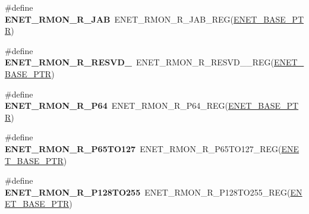 \begin{DoxyCompactItemize}
\item 
\hypertarget{group___e_n_e_t___register___accessor___macros_gac89cfeeea3d6804f8e5e5ec467472b7e}{}\#define {\bfseries E\+N\+E\+T\+\_\+\+R\+M\+O\+N\+\_\+\+R\+\_\+\+J\+A\+B}~E\+N\+E\+T\+\_\+\+R\+M\+O\+N\+\_\+\+R\+\_\+\+J\+A\+B\+\_\+\+R\+E\+G(\hyperlink{group___e_n_e_t___peripheral_gab64a2d991cc2bd76dd55ee25a52dcb5c}{E\+N\+E\+T\+\_\+\+B\+A\+S\+E\+\_\+\+P\+T\+R})\label{group___e_n_e_t___register___accessor___macros_gac89cfeeea3d6804f8e5e5ec467472b7e}

\item 
\hypertarget{group___e_n_e_t___register___accessor___macros_ga0b266930d57561032880164a69b9f7b1}{}\#define {\bfseries E\+N\+E\+T\+\_\+\+R\+M\+O\+N\+\_\+\+R\+\_\+\+R\+E\+S\+V\+D\+\_}~E\+N\+E\+T\+\_\+\+R\+M\+O\+N\+\_\+\+R\+\_\+\+R\+E\+S\+V\+D\+\_\+\_\+\+R\+E\+G(\hyperlink{group___e_n_e_t___peripheral_gab64a2d991cc2bd76dd55ee25a52dcb5c}{E\+N\+E\+T\+\_\+\+B\+A\+S\+E\+\_\+\+P\+T\+R})\label{group___e_n_e_t___register___accessor___macros_ga0b266930d57561032880164a69b9f7b1}

\item 
\hypertarget{group___e_n_e_t___register___accessor___macros_ga358714bb5af0b88fa0754074684960f1}{}\#define {\bfseries E\+N\+E\+T\+\_\+\+R\+M\+O\+N\+\_\+\+R\+\_\+\+P64}~E\+N\+E\+T\+\_\+\+R\+M\+O\+N\+\_\+\+R\+\_\+\+P64\+\_\+\+R\+E\+G(\hyperlink{group___e_n_e_t___peripheral_gab64a2d991cc2bd76dd55ee25a52dcb5c}{E\+N\+E\+T\+\_\+\+B\+A\+S\+E\+\_\+\+P\+T\+R})\label{group___e_n_e_t___register___accessor___macros_ga358714bb5af0b88fa0754074684960f1}

\item 
\hypertarget{group___e_n_e_t___register___accessor___macros_ga3a41b9ac512a20e1a99638ef76b9f2fa}{}\#define {\bfseries E\+N\+E\+T\+\_\+\+R\+M\+O\+N\+\_\+\+R\+\_\+\+P65\+T\+O127}~E\+N\+E\+T\+\_\+\+R\+M\+O\+N\+\_\+\+R\+\_\+\+P65\+T\+O127\+\_\+\+R\+E\+G(\hyperlink{group___e_n_e_t___peripheral_gab64a2d991cc2bd76dd55ee25a52dcb5c}{E\+N\+E\+T\+\_\+\+B\+A\+S\+E\+\_\+\+P\+T\+R})\label{group___e_n_e_t___register___accessor___macros_ga3a41b9ac512a20e1a99638ef76b9f2fa}

\item 
\hypertarget{group___e_n_e_t___register___accessor___macros_gaaef2afce7e061100f21ed17b33452abe}{}\#define {\bfseries E\+N\+E\+T\+\_\+\+R\+M\+O\+N\+\_\+\+R\+\_\+\+P128\+T\+O255}~E\+N\+E\+T\+\_\+\+R\+M\+O\+N\+\_\+\+R\+\_\+\+P128\+T\+O255\+\_\+\+R\+E\+G(\hyperlink{group___e_n_e_t___peripheral_gab64a2d991cc2bd76dd55ee25a52dcb5c}{E\+N\+E\+T\+\_\+\+B\+A\+S\+E\+\_\+\+P\+T\+R})\label{group___e_n_e_t___register___accessor___macros_gaaef2afce7e061100f21ed17b33452abe}


\end{DoxyCompactItemize}
